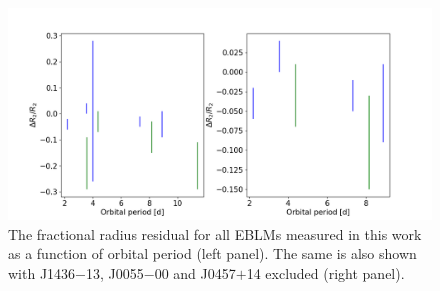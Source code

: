 

\begin{figure}
    \centering
    \includegraphics[width=\textwidth]{9-Discussion/images/inflation_with_period.png}
    \caption{The fractional radius residual for all EBLMs measured in this work as a function of orbital period (left panel). The same is also shown with J1436$-$13, J0055$-$00 and J0457$+$14 excluded (right panel).}
    \label{discussion:fig:inflation_with_period}
\end{figure}


